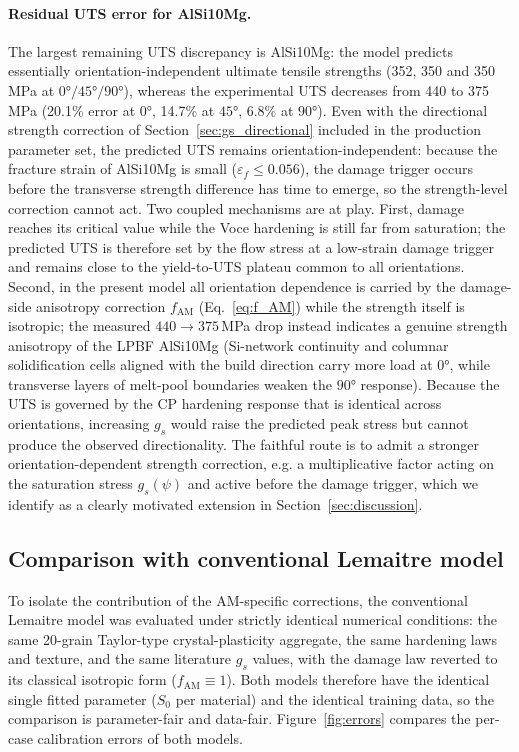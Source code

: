 \documentclass[twocolumn]{sagej}
\begin{document}
\paragraph{Residual UTS error for AlSi10Mg.}
The largest remaining UTS discrepancy is AlSi10Mg: the model predicts essentially orientation-independent ultimate tensile strengths (352, 350 and 350\,MPa at $\ang{0}/\ang{45}/\ang{90}$), whereas the experimental UTS decreases from 440 to 375\,MPa (20.1\% error at $\ang{0}$, 14.7\% at $\ang{45}$, 6.8\% at $\ang{90}$). Even with the directional strength correction of Section~\ref{sec:gs_directional} included in the production parameter set, the predicted UTS remains orientation-independent: because the fracture strain of AlSi10Mg is small ($\varepsilon_f \le 0.056$), the damage trigger occurs before the transverse strength difference has time to emerge, so the strength-level correction cannot act. Two coupled mechanisms are at play. First, damage reaches its critical value while the Voce hardening is still far from saturation; the predicted UTS is therefore set by the flow stress at a low-strain damage trigger and remains close to the yield-to-UTS plateau common to all orientations. Second, in the present model all orientation dependence is carried by the damage-side anisotropy correction $f_{\mathrm{AM}}$ (Eq.~\eqref{eq:f_AM}) while the strength itself is isotropic; the measured $440\to375$\,MPa drop instead indicates a genuine strength anisotropy of the LPBF AlSi10Mg (Si-network continuity and columnar solidification cells aligned with the build direction carry more load at $\ang{0}$, while transverse layers of melt-pool boundaries weaken the $\ang{90}$ response). Because the UTS is governed by the CP hardening response that is identical across orientations, increasing $g_s$ would raise the predicted peak stress but cannot produce the observed directionality. The faithful route is to admit a stronger orientation-dependent strength correction, e.g. a multiplicative factor acting on the saturation stress $g_s(\psi)$ and active before the damage trigger, which we identify as a clearly motivated extension in Section~\ref{sec:discussion}.

\subsection{Comparison with conventional Lemaitre model}

To isolate the contribution of the AM-specific corrections, the conventional Lemaitre model was evaluated under strictly identical numerical conditions: the same 20-grain Taylor-type crystal-plasticity aggregate, the same hardening laws and texture, and the same literature $g_s$ values, with the damage law reverted to its classical isotropic form ($f_{\mathrm{AM}} \equiv 1$). Both models therefore have the identical single fitted parameter ($S_0$ per material) and the identical training data, so the comparison is parameter-fair and data-fair. Figure~\ref{fig:errors} compares the per-case calibration errors of both models.
\end{document}
